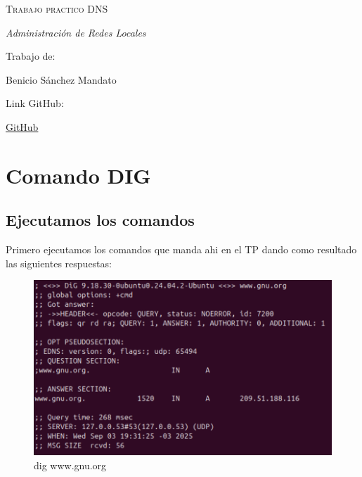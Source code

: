 \documentclass{article}
\begin{document}
\begin{titlepage}
\centering

{\scshape\Huge Trabajo practico DNS \par}
{\itshape\Large Administración de Redes Locales \par}
\vspace{10cm}
{\Large Trabajo de:\par}

{\Large Benicio Sánchez Mandato\par}

\vspace{1cm}
{\Large Link GitHub:\par}
\href{https://github.com/BenicioPoli/DNS}{GitHub}
\end{titlepage}



\section{Comando DIG}

\subsection{Ejecutamos los comandos}

Primero ejecutamos los comandos que manda ahi en el TP dando como resultado las siguientes respuestas:

\begin{figure}
    \centering
    \includegraphics[width=1\linewidth]{Fotos/PrimerDig.png}
    \caption{dig www.gnu.org}
\end{figure}
\end{document}
